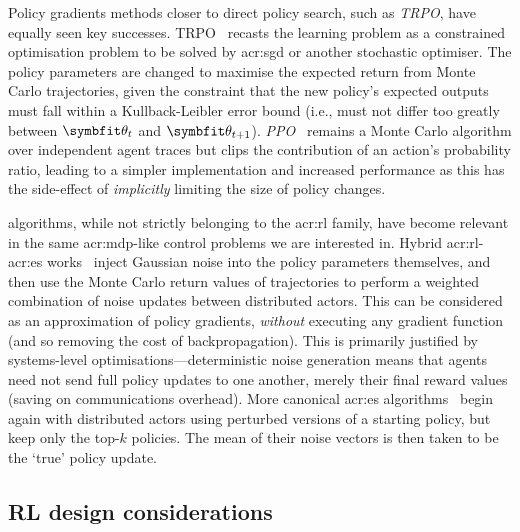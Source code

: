 Policy gradients methods closer to direct policy search, such as \emph{TRPO}, have equally seen key successes.
TRPO~\parencite{DBLP:conf/icml/SchulmanLAJM15} recasts the learning problem as a constrained optimisation problem to be solved by \gls{acr:sgd} or another stochastic optimiser.
The policy parameters are changed to maximise the expected return from Monte Carlo trajectories, given the constraint that the new policy's expected outputs must fall within a Kullback-Leibler error bound (i.e., must not differ too greatly between $\wvec{t}$ and $\wvec{t+1}$).
\emph{PPO}~\parencite{DBLP:journals/corr/SchulmanWDRK17} remains a Monte Carlo algorithm over independent agent traces but clips the contribution of an action's probability ratio, leading to a simpler implementation and increased performance as this has the side-effect of \emph{implicitly} limiting the size of policy changes.

 algorithms, while not strictly belonging to the \gls{acr:rl} family, have become relevant in the same \gls{acr:mdp}-like control problems we are interested in.
Hybrid \gls{acr:rl}-\gls{acr:es} works~\parencite{DBLP:journals/corr/SalimansHCS17} inject Gaussian noise into the policy parameters themselves, and then use the Monte Carlo return values of trajectories to perform a weighted combination of noise updates between distributed actors.
This can be considered as an approximation of policy gradients, \emph{without} executing any gradient function (and so removing the cost of backpropagation).
This is primarily justified by systems-level optimisations---deterministic noise generation means that agents need not send full policy updates to one another, merely their final reward values (saving on communications overhead).
More canonical \gls{acr:es} algorithms~\parencite{DBLP:journals/corr/abs-1802-08842} begin again with distributed actors using perturbed versions of a starting policy, but keep only the top-$k$ policies.
The mean of their noise vectors is then taken to be the `true' policy update.

%
%
%

\subsection{RL design considerations}
